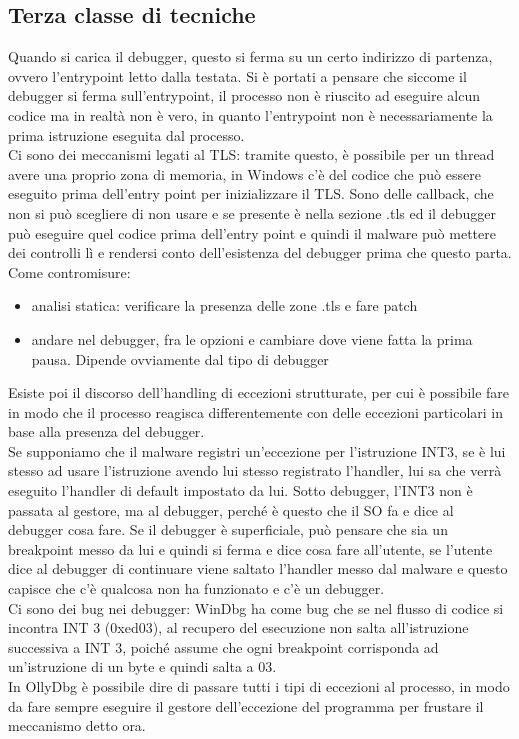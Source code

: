 \documentclass[12pt, oneside]{extbook}
\begin{document}
\subsection{Terza classe di tecniche}
Quando si carica il debugger, questo si ferma su un certo indirizzo di partenza, ovvero l'entrypoint letto dalla testata. Si è portati a pensare che siccome il debugger si ferma sull'entrypoint, il processo non è riuscito ad eseguire alcun codice ma in realtà non è vero, in quanto l'entrypoint non è necessariamente la prima istruzione eseguita dal processo.\\Ci sono dei meccanismi legati al TLS: tramite questo, è possibile per un thread avere una proprio zona di memoria, in Windows c'è del codice che può essere eseguito prima dell'entry point per inizializzare il TLS. Sono delle callback, che non si può scegliere di non usare e se presente è nella sezione .tls ed il debugger può eseguire quel codice prima dell'entry point e quindi il malware può mettere dei controlli lì e rendersi conto dell'esistenza del debugger prima che questo parta.\\Come contromisure:
\begin{itemize}
\item analisi statica: verificare la presenza delle zone .tls e fare patch
\item andare nel debugger, fra le opzioni e cambiare dove viene fatta la prima pausa. Dipende ovviamente dal tipo di debugger
\end{itemize}
Esiste poi il discorso dell'handling di eccezioni strutturate, per cui è possibile fare in modo che il processo reagisca differentemente con delle eccezioni particolari in base alla presenza del debugger.\\Se supponiamo che il malware registri un'eccezione per l'istruzione INT3, se è lui stesso ad usare l'istruzione avendo lui stesso registrato l'handler, lui sa che verrà eseguito l'handler di default impostato da lui. Sotto debugger, l'INT3 non è passata al gestore, ma al debugger, perché è questo che il SO fa e dice al debugger cosa fare. Se il debugger è superficiale, può pensare che sia un breakpoint messo da lui e quindi si ferma e dice cosa fare all'utente, se l'utente dice al debugger di continuare viene saltato l'handler messo dal malware e questo capisce che c'è qualcosa non ha funzionato e c'è un debugger.\\Ci sono dei bug nei debugger: WinDbg ha come bug che se nel flusso di codice si incontra INT 3 (0xed03), al recupero del esecuzione non salta all'istruzione successiva a INT 3, poiché assume che ogni breakpoint corrisponda ad un'istruzione di un byte e quindi salta a 03.\\In OllyDbg è possibile dire di passare tutti i tipi di eccezioni al processo, in modo da fare sempre eseguire il gestore dell'eccezione del programma per frustare il meccanismo detto ora.
\end{document}
